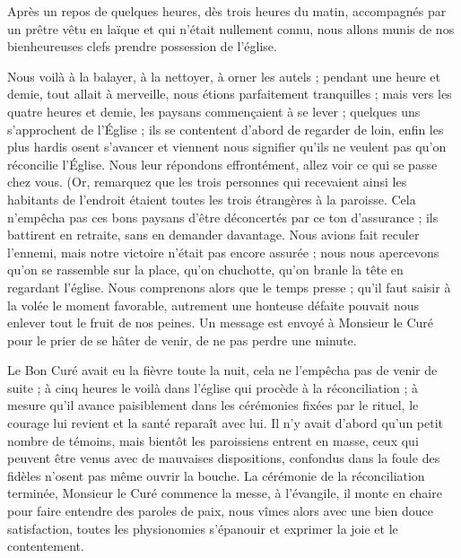 \documentclass[11pt,a4paper]{report}
\begin{document}
Après un repos de quelques heures, dès trois heures du matin, accompagnés par un prêtre vêtu en laïque et qui n'était nullement connu, nous allons munis de nos bienheureuses clefs prendre possession de l'église.

Nous voilà à la balayer, à la nettoyer, à orner les autels ; pendant une heure et demie, tout allait à merveille, nous étions parfaitement tranquilles ; mais vers les quatre heures et demie, les paysans commençaient à se lever ; quelques uns s'approchent de l'Église ; ils se contentent d'abord de regarder de loin, enfin les plus hardis osent s'avancer et viennent nous signifier qu'ils ne veulent pas qu'on réconcilie l'Église. Nous leur répondons effrontément, allez voir ce qui se passe chez vous. (Or, remarquez que les trois personnes qui recevaient ainsi les habitants de l'endroit étaient toutes les trois étrangères à la paroisse. Cela n'empêcha pas ces bons paysans d'être déconcertés par ce ton d'assurance ; ils battirent en retraite, sans en demander davantage. Nous avions fait reculer l'ennemi, mais notre victoire n'était pas encore assurée ; nous nous apercevons qu'on se rassemble sur la place, qu'on chuchotte, qu'on branle la tête en regardant l'église. Nous comprenons alors que le temps presse ; qu'il faut saisir à la volée le moment favorable, autrement une honteuse défaite pouvait nous enlever tout le fruit de nos peines. Un message est envoyé à Monsieur le Curé pour le prier de se hâter de venir, de ne pas perdre une minute.

Le Bon Curé avait eu la fièvre toute la nuit, cela ne l'empêcha pas de venir de suite ; à cinq heures le voilà dans l'église qui procède à la réconciliation ; à mesure qu'il avance paisiblement dans les cérémonies fixées par le rituel, le courage lui revient et la santé reparaît avec lui. Il n'y avait d'abord qu'un petit nombre de témoins, mais bientôt les paroissiens entrent en masse, ceux qui peuvent être venus avec de mauvaises dispositions, confondus dans la foule des fidèles n'osent pas même ouvrir la bouche. La cérémonie de la réconciliation terminée, Monsieur le Curé commence la messe, à l'évangile, il monte en chaire pour faire entendre des paroles de paix, nous vîmes alors avec une bien douce satisfaction, toutes les physionomies s'épanouir et exprimer la joie et le contentement.
\end{document}

